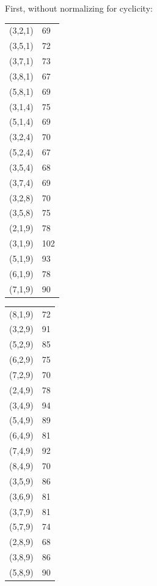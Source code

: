 \documentclass[11pt]{article}
\begin{document}
First, without normalizing for cyclicity:

\vskip 10pt
\begin{minipage}{.25\textwidth}
\begin{tabular}{ll}
(3,2,1) & 69 \\
(3,5,1) & 72 \\
(3,7,1) & 73 \\
(3,8,1) & 67 \\
(5,8,1) & 69 \\
(3,1,4) & 75 \\
(5,1,4) & 69 \\
(3,2,4) & 70 \\
(5,2,4) & 67 \\
(3,5,4) & 68 \\
(3,7,4) & 69 \\
(3,2,8) & 70 \\
(3,5,8) & 75 \\
(2,1,9) & 78 \\
(3,1,9) & 102 \\
(5,1,9) & 93 \\
(6,1,9) & 78 \\
(7,1,9) & 90 \\
\end{tabular}
\end{minipage}
\begin{minipage}{.25\textwidth}
\begin{tabular}{ll}
(8,1,9) & 72 \\
(3,2,9) & 91 \\
(5,2,9) & 85 \\
(6,2,9) & 75 \\
(7,2,9) & 70 \\
(2,4,9) & 78 \\
(3,4,9) & 94 \\
(5,4,9) & 89 \\
(6,4,9) & 81 \\
(7,4,9) & 92 \\
(8,4,9) & 70 \\
(3,5,9) & 86 \\
(3,6,9) & 81 \\
(3,7,9) & 81 \\
(5,7,9) & 74 \\
(2,8,9) & 68 \\
(3,8,9) & 86 \\
(5,8,9) & 90 \\
\end{tabular}
\end{minipage}
\end{document}
